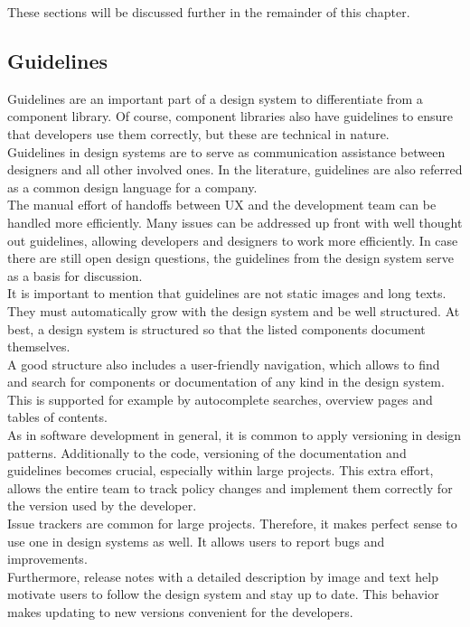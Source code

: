 These sections will be discussed further in the remainder of this chapter. \cite{macdonald_practical_2019}\cite{vesselov_building_2019}

\subsection{Guidelines}
Guidelines are an important part of a design system to differentiate from a component library. Of course, component libraries also have guidelines to ensure that developers use them correctly, but these are technical in nature.  \\
Guidelines in design systems are to serve as communication assistance between designers and all other involved ones. In the literature, guidelines are also referred as a common design language for a company.\\
The manual effort of handoffs between UX and the development team can be handled more efficiently. Many issues can be addressed up front with well thought out guidelines, allowing developers and designers to work more efficiently. In case there are still open design questions, the guidelines from the design system serve as a basis for discussion. \cite{vesselov_building_2019} \\

It is important to mention that guidelines are not static images and long texts. They must automatically grow with the design system and be well structured. At best, a design system is structured so that the listed components document themselves. \\
A good structure also includes a user-friendly navigation, which allows to find and search for components or documentation of any kind in the design system. This is supported for example by autocomplete searches, overview pages and tables of contents.  \cite{macdonald_practical_2019}\cite{vesselov_building_2019} \\

As in software development in general, it is common to apply versioning in design patterns. Additionally to the code, versioning of the documentation and guidelines becomes crucial, especially within large projects. This extra effort, allows the entire team to track policy changes and implement them correctly for the version used by the developer. \\
Issue trackers are common for large projects. Therefore, it makes perfect sense to use one in design systems as well. It allows users to report bugs and improvements. \\
Furthermore, release notes with a detailed description by image and text help motivate users to follow the design system and stay up to date. This behavior makes updating to new versions convenient for the developers. \cite{macdonald_practical_2019} \\

